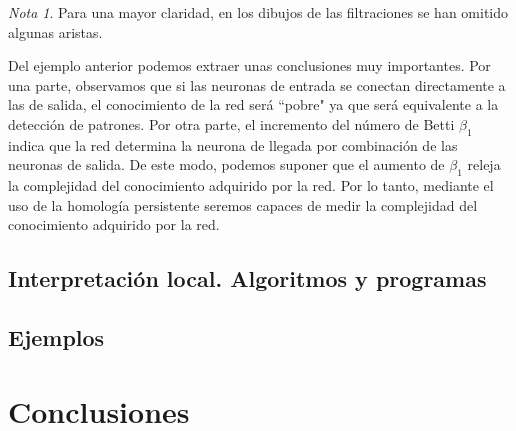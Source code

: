 \documentclass[12pt, a4paper, twoside]{book}
\numberwithin{equation}{section}
\theoremstyle{definition}
\newenvironment{ejem}
  {\pushQED{\qed}\renewcommand{\qedsymbol}{$\blacktriangleleft$}\ejemplo}
  {\popQED\endejemplo}
\theoremstyle{remark}
\newtheorem*{remark}{Nota}
\theoremstyle{plain}
\begin{document}
\begin{ejem}
\begin{figure}[H]
\begin{figure}[H]
				\end{figure}
			\endminipage
				\begin{figure}[H]
				\end{figure}
			\endminipage
		\end{figure}
		\begin{remark}
			Para una mayor claridad, en los dibujos de las filtraciones se han omitido algunas aristas.
		\end{remark}
	\end{ejem}	
	Del ejemplo anterior podemos extraer unas conclusiones muy importantes. Por una parte, observamos que si las neuronas de entrada se conectan
	directamente a las de salida, el conocimiento de la red será ``pobre" ya que será equivalente a la detección de patrones. Por otra parte,
	el incremento del número de Betti $\beta_{1}$ indica que la red determina la neurona de llegada por combinación de las neuronas de salida. De este modo,
	podemos suponer que el aumento de $\beta_{1}$ releja la complejidad del conocimiento adquirido por la red. Por lo tanto, mediante el uso de la homología persistente
	seremos capaces de medir la complejidad del conocimiento adquirido por la red.


	\section{Interpretación local. Algoritmos y programas}

	\section{Ejemplos}

	\chapter{Conclusiones}

	\newpage
	\nocite{*}
	
	
\end{document}
